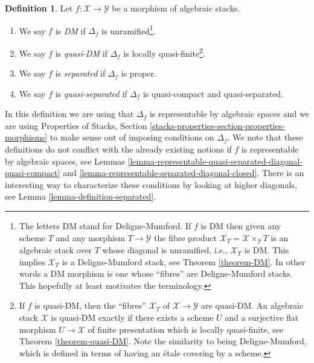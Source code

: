 \documentclass{stacks-project}
\theoremstyle{plain}
\theoremstyle{definition}
\newtheorem{definition}[subsection]{Definition}
\theoremstyle{remark}
\numberwithin{equation}{subsection}
\begin{document}
\begin{definition}
\label{definition-separated}
Let $f : \mathcal{X} \to \mathcal{Y}$ be a morphism of algebraic stacks.
\begin{enumerate}
\item We say $f$ is {\it DM} if $\Delta_f$ is unramified\footnote{The
letters DM stand for Deligne-Mumford. If $f$ is DM then given any scheme
$T$ and any morphism $T \to \mathcal{Y}$ the fibre product
$\mathcal{X}_T = \mathcal{X} \times_\mathcal{Y} T$
is an algebraic stack over $T$ whose diagonal is unramified, i.e.,
$\mathcal{X}_T$ is DM. This implies $\mathcal{X}_T$
is a Deligne-Mumford stack, see Theorem \ref{theorem-DM}.
In other words a DM morphism is one whose ``fibres'' are Deligne-Mumford
stacks. This hopefully at least motivates the terminology.}.
\item We say $f$ is {\it quasi-DM} if $\Delta_f$ is
locally quasi-finite\footnote{If $f$ is quasi-DM, then the
``fibres'' $\mathcal{X}_T$ of $\mathcal{X} \to \mathcal{Y}$ are quasi-DM. An
algebraic stack $\mathcal{X}$ is quasi-DM exactly if there exists a
scheme $U$ and a surjective flat morphism $U \to \mathcal{X}$ of finite
presentation which is locally quasi-finite, see
Theorem \ref{theorem-quasi-DM}.
Note the similarity to being Deligne-Mumford, which
is defined in terms of having an \'etale covering by a scheme.}.
\item We say $f$ is {\it separated} if $\Delta_f$ is proper.
\item We say $f$ is {\it quasi-separated} if $\Delta_f$
is quasi-compact and quasi-separated.
\end{enumerate}
\end{definition}

\noindent
In this definition we are using that $\Delta_f$ is representable by algebraic
spaces and we are using
Properties of Stacks,
Section \ref{stacks-properties-section-properties-morphisms}
to make sense out of imposing conditions on $\Delta_f$.
We note that these definitions do not conflict with the already
existing notions if $f$ is representable by algebraic spaces, see
Lemmas \ref{lemma-representable-quasi-separated-diagonal-quasi-compact} and
\ref{lemma-representable-separated-diagonal-closed}.
There is an interesting way to characterize these conditions by looking
at higher diagonals, see
Lemma \ref{lemma-definition-separated}.
\end{document}
